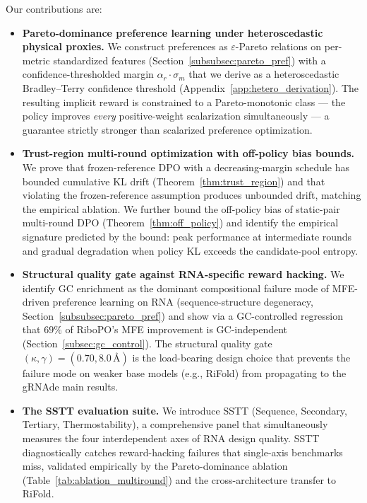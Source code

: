 Our contributions are:
\begin{itemize}[leftmargin=*]
\item \textbf{Pareto-dominance preference learning under heteroscedastic physical proxies.} We construct preferences as $\varepsilon$-Pareto relations on per-metric standardized features (Section~\ref{subsubsec:pareto_pref}) with a confidence-thresholded margin $\alpha_r\!\cdot\!\sigma_m$ that we derive as a heteroscedastic Bradley--Terry confidence threshold (Appendix~\ref{app:hetero_derivation}). The resulting implicit reward is constrained to a Pareto-monotonic class --- the policy improves \emph{every} positive-weight scalarization simultaneously --- a guarantee strictly stronger than scalarized preference optimization.
\item \textbf{Trust-region multi-round optimization with off-policy bias bounds.} We prove that frozen-reference DPO with a decreasing-margin schedule has bounded cumulative KL drift (Theorem~\ref{thm:trust_region}) and that violating the frozen-reference assumption produces unbounded drift, matching the empirical ablation. We further bound the off-policy bias of static-pair multi-round DPO (Theorem~\ref{thm:off_policy}) and identify the empirical signature predicted by the bound: peak performance at intermediate rounds and gradual degradation when policy KL exceeds the candidate-pool entropy.
\item \textbf{Structural quality gate against RNA-specific reward hacking.} We identify GC enrichment as the dominant compositional failure mode of MFE-driven preference learning on RNA (sequence-structure degeneracy, Section~\ref{subsubsec:pareto_pref}) and show via a GC-controlled regression that $69\%$ of RiboPO's MFE improvement is GC-independent (Section~\ref{subsec:gc_control}). The structural quality gate $(\kappa,\gamma)=(0.70,8.0\,\text{\AA})$ is the load-bearing design choice that prevents the failure mode on weaker base models (e.g., RiFold) from propagating to the gRNAde main results.
\item \textbf{The SSTT evaluation suite.} We introduce SSTT (Sequence, Secondary, Tertiary, Thermostability), a comprehensive panel that simultaneously measures the four interdependent axes of RNA design quality. SSTT diagnostically catches reward-hacking failures that single-axis benchmarks miss, validated empirically by the Pareto-dominance ablation (Table~\ref{tab:ablation_multiround}) and the cross-architecture transfer to RiFold.
\end{itemize}

